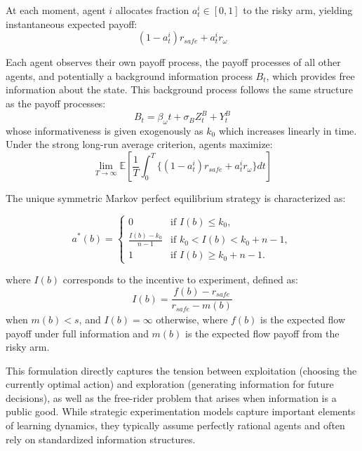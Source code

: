 At each moment, agent $i$ allocates fraction $a^i_{t} \in [0,1]$ to the risky arm, yielding instantaneous expected payoff:
\begin{equation*}
    (1-a^i_{t})r_\textit{safe} + a^i_{t}r_{\omega}
\end{equation*}

Each agent observes their own payoff process, the payoff processes of all other agents, and potentially a background information process $B_t$, which provides free information about the state. This background process follows the same structure as the payoff processes:
\begin{equation*}
    B_t = \beta_{\omega} t + \sigma_B Z^B_t + Y^B_t
\end{equation*}
whose informativeness is given exogenously as $k_0$ which increases linearly in time. Under the strong long-run average criterion, agents maximize:
\begin{equation}
    \lim_{T \to \infty} \mathbb{E}\left[\frac{1}{T}\int_0^{T}\{(1-a^i_{t})r_\textit{safe} + a^i_{t}r_{\omega}\}dt\right]
\end{equation}

The unique symmetric Markov perfect equilibrium strategy is characterized as:

\begin{equation}
    a^*(b) = 
    \begin{cases}
    0 & \text{if } I(b) \leq k_0, \\
    \frac{I(b)-k_0}{n-1} & \text{if } k_0 < I(b) < k_0 + n - 1, \\
    1 & \text{if } I(b) \geq k_0 + n - 1.
    \end{cases}
    \end{equation}

where $I(b)$ corresponds to the incentive to experiment, defined as:
\begin{equation*}
    I(b) = \frac{f(b) - r_\textit{safe}}{r_\textit{safe} - m(b)}
\end{equation*}
when $m(b) < s$, and $I(b) = \infty$ otherwise, where $f(b)$ is the expected flow payoff under full information and $m(b)$ is the expected flow payoff from the risky arm.

This formulation directly captures the tension between exploitation (choosing the currently optimal action) and exploration (generating information for future decisions), as well as the free-rider problem that arises when information is a public good. While strategic experimentation models capture important elements of learning dynamics, they typically assume perfectly rational agents and often rely on standardized information structures.

